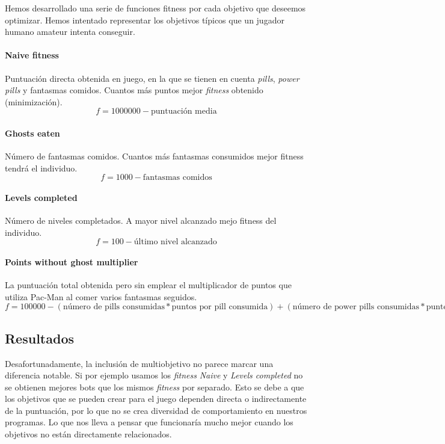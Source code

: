 Hemos desarrollado una serie de funciones fitness por cada objetivo que deseemos optimizar. Hemos intentado representar los objetivos típicos que un jugador humano amateur intenta conseguir.

\paragraph{Naive fitness}
Puntuación directa obtenida en juego, en la que se tienen en cuenta \textit{pills}, \textit{power pills} y fantasmas comidos. Cuantos más puntos mejor \textit{fitness} obtenido (minimización).
\begin{equation}
f = 1000000 - \textrm{puntuación media}
\end{equation}

\paragraph{Ghosts eaten}
Número de fantasmas comidos. Cuantos más fantasmas consumidos mejor fitness tendrá el individuo.
\begin{equation}
f = 1000 - \textrm{fantasmas comidos}
\end{equation}

\paragraph{Levels completed}
Número de niveles completados. A mayor nivel alcanzado mejo fitness del individuo.
\begin{equation}
f = 100 - \textrm{último nivel alcanzado}
\end{equation}

\paragraph{Points without ghost multiplier}
La puntuación total obtenida pero sin emplear el multiplicador de puntos que utiliza Pac-Man al comer varios fantasmas seguidos.
\begin{equation}
f = 100000 - (\textrm{número de pills consumidas} * \textrm{puntos por pill consumida})
+ (\textrm{número de power pills consumidas} * \textrm{puntos por power pill consumida})
+ (\textrm{número de fantasmas consumidos * puntos por fantasma consumida})
\end{equation}

\subsection{Resultados}
Desafortunadamente, la inclusión de multiobjetivo no parece marcar una diferencia notable. Si por ejemplo usamos los \textit{fitness} \textit{Naive} y \textit{Levels completed} no se obtienen mejores bots que los mismos \textit{fitness} por separado. Esto se debe a que los objetivos que se pueden crear para el juego dependen directa o indirectamente de la puntuación, por lo que no se crea diversidad de comportamiento en nuestros programas. Lo que nos lleva a pensar que funcionaría mucho mejor cuando los objetivos no están directamente relacionados.
 
